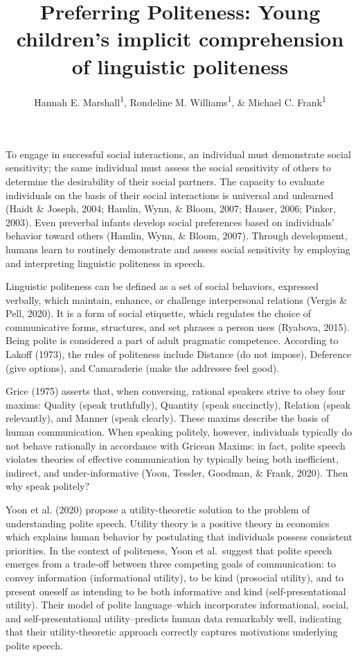 \documentclass[
  english,
  man,floatsintext]{apa6}
\title{Preferring Politeness: Young children's implicit comprehension of linguistic politeness}
\author{Hannah E. Marshall\textsuperscript{1}, Rondeline M. Williams\textsuperscript{1}, \& Michael C. Frank\textsuperscript{1}}
\date{}
\affiliation{\vspace{0.5cm}\textsuperscript{1} Stanford University}
\begin{document}
\maketitle

To engage in successful social interactions, an individual must demonstrate social sensitivity; the same individual must assess the social sensitivity of others to determine the desirability of their social partners. The capacity to evaluate individuals on the basis of their social interactions is universal and unlearned (Haidt \& Joseph, 2004; Hamlin, Wynn, \& Bloom, 2007; Hauser, 2006; Pinker, 2003). Even preverbal infants develop social preferences based on individuals' behavior toward others (Hamlin, Wynn, \& Bloom, 2007). Through development, humans learn to routinely demonstrate and assess social sensitivity by employing and interpreting linguistic politeness in speech.

Linguistic politeness can be defined as a set of social behaviors, expressed verbally, which maintain, enhance, or challenge interpersonal relations (Vergis \& Pell, 2020). It is a form of social etiquette, which regulates the choice of communicative forms, structures, and set phrases a person uses (Ryabova, 2015). Being polite is considered a part of adult pragmatic competence. According to Lakoff (1973), the rules of politeness include Distance (do not impose), Deference (give options), and Camaraderie (make the addressee feel good).

Grice (1975) asserts that, when conversing, rational speakers strive to obey four maxims: Quality (speak truthfully), Quantity (speak succinctly), Relation (speak relevantly), and Manner (speak clearly). These maxims describe the basis of human communication. When speaking politely, however, individuals typically do not behave rationally in accordance with Gricean Maxims: in fact, polite speech violates theories of effective communication by typically being both inefficient, indirect, and under-informative (Yoon, Tessler, Goodman, \& Frank, 2020). Then why speak politely?

Yoon et al. (2020) propose a utility-theoretic solution to the problem of understanding polite speech. Utility theory is a positive theory in economics which explains human behavior by postulating that individuals possess consistent priorities. In the context of politeness, Yoon et al.~suggest that polite speech emerges from a trade-off between three competing goals of communication: to convey information (informational utility), to be kind (prosocial utility), and to present oneself as intending to be both informative and kind (self-presentational utility). Their model of polite language--which incorporates informational, social, and self-presentational utility--predicts human data remarkably well, indicating that their utility-theoretic approach correctly captures motivations underlying polite speech.
\end{document}
